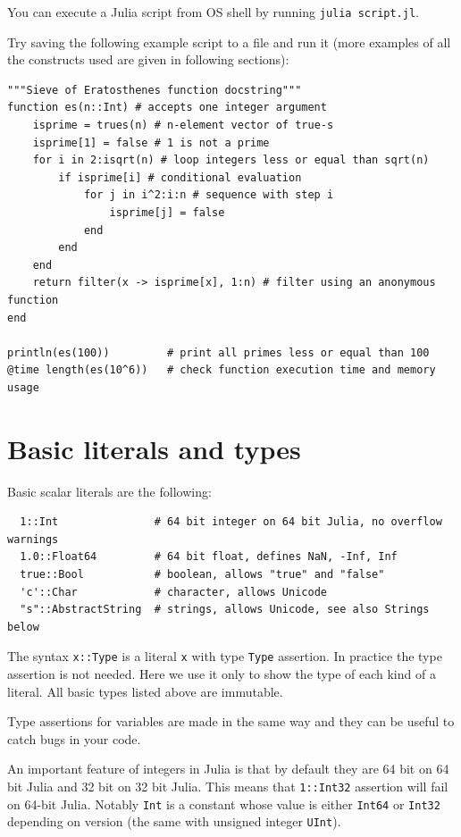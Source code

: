 \documentclass[10pt,a4paper]{article}
\begin{document}
You can execute a Julia script from OS shell by running \lstinline|julia script.jl|.

Try saving the following example script to a file and run it (more examples of all the constructs used are given in following sections):
\begin{lstlisting}
"""Sieve of Eratosthenes function docstring"""
function es(n::Int) # accepts one integer argument
    isprime = trues(n) # n-element vector of true-s
    isprime[1] = false # 1 is not a prime
    for i in 2:isqrt(n) # loop integers less or equal than sqrt(n)
        if isprime[i] # conditional evaluation
            for j in i^2:i:n # sequence with step i
                isprime[j] = false
            end
        end
    end
    return filter(x -> isprime[x], 1:n) # filter using an anonymous function
end

println(es(100))         # print all primes less or equal than 100
@time length(es(10^6))   # check function execution time and memory usage
\end{lstlisting}

\section{Basic literals and types}
Basic scalar literals are the following:
\begin{lstlisting}
  1::Int               # 64 bit integer on 64 bit Julia, no overflow warnings
  1.0::Float64         # 64 bit float, defines NaN, -Inf, Inf
  true::Bool           # boolean, allows "true" and "false"
  'c'::Char            # character, allows Unicode
  "s"::AbstractString  # strings, allows Unicode, see also Strings below
\end{lstlisting}
The syntax \lstinline|x::Type| is a literal \lstinline|x| with type \lstinline|Type| assertion. In practice the type assertion is not needed. Here we use it only to show the type of each kind of a literal. All basic types listed above are immutable.

Type assertions for variables are made in the same way and they can be useful to catch bugs in your code.

An important feature of integers in Julia is that by default they are 64 bit on 64 bit Julia and 32 bit on 32 bit Julia. This means that \lstinline|1::Int32| assertion will fail on 64-bit Julia. Notably \lstinline|Int| is a constant whose value is either \lstinline|Int64| or \lstinline|Int32| depending on version (the same with unsigned integer \lstinline|UInt|).
\end{document}
